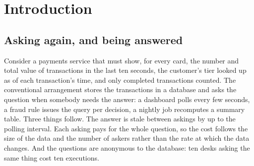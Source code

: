 \documentclass[11pt,a4paper]{article}
\renewcommand{\_}{\oldunderscore\allowbreak}
\begin{document}
\begin{abstract}
Every formal claim is marked with what carries it in the implementation: a named test that runs, a
test that covers part of it, an argument from the code with no test, or nothing. The markers are not
uniformly favourable. The reference algebra is tested as stated but is imported by no module of the
running engine, and the engine is one node, with clustering built as libraries that no node consumes.
The four gaps the first edition reported against its own claims --- an invariant of the served view,
a replacement over a change feed, the exact seam over a real Kafka broker, and fate-sharing on a shared
lane --- have since been closed by tests, and three of the four found a real defect on the way.
collects the markers,  describes the test tiers and the findings register behind them,
 reports only figures present in the repository together with the conditions they
were taken under, and  states what the implementation does not establish.
\end{abstract}

\tableofcontents
\bigskip

\section{Introduction}\label{sec:intro}

\subsection{Asking again, and being answered}

Consider a payments service that must show, for every card, the number and total value of
transactions in the last ten seconds, the customer's tier looked up as of each transaction's time,
and only completed transactions counted. The conventional arrangement stores the transactions in a
database and asks the question when somebody needs the answer: a dashboard polls every few seconds,
a fraud rule issues the query per decision, a nightly job recomputes a summary table. Three things
follow. The answer is stale between askings by up to the polling interval. Each asking pays for the
whole question, so the cost follows the size of the data and the number of askers rather than the
rate at which the data changes. And the questions are anonymous to the database: ten desks asking
the same thing cost ten executions.
\end{document}
